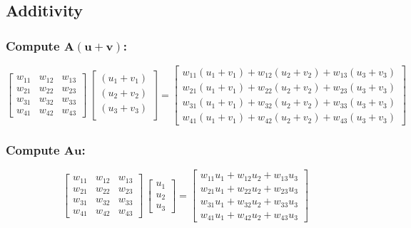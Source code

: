 \documentclass[12pt]{article}
\newcommand{\vsp}{\vspace*{1em}}
\begin{document}
\subsection{Additivity}

\subsubsection*{\noindent Compute $\mathbf{A} (\mathbf{u} + \mathbf{v})$:}

\[
    \begin{bmatrix}
        w_{11} & w_{12} & w_{13} \\
        w_{21} & w_{22} & w_{23} \\
        w_{31} & w_{32} & w_{33} \\
        w_{41} & w_{42} & w_{43}
    \end{bmatrix}
    \,
    \begin{bmatrix}
        (u_1 + v_1) \\
        (u_2 + v_2) \\
        (u_3 + v_3) \\
    \end{bmatrix}
    =
    \begin{bmatrix}
        w_{11} (u_1 + v_1)  + w_{12} (u_2 + v_2) + w_{13} (u_3 + v_3) \\
        w_{21} (u_1 + v_1)  + w_{22} (u_2 + v_2) + w_{23} (u_3 + v_3) \\
        w_{31} (u_1 + v_1)  + w_{32} (u_2 + v_2) + w_{33} (u_3 + v_3) \\
        w_{41} (u_1 + v_1)  + w_{42} (u_2 + v_2) + w_{43} (u_3 + v_3)
    \end{bmatrix}
\]

\vsp

\subsubsection*{Compute $\mathbf{A} \mathbf{u}$:}

\[
    \begin{bmatrix}
        w_{11} & w_{12} & w_{13} \\
        w_{21} & w_{22} & w_{23} \\
        w_{31} & w_{32} & w_{33} \\
        w_{41} & w_{42} & w_{43}
    \end{bmatrix}
    \,
    \begin{bmatrix}
        u_1 \\
        u_2 \\
        u_3
    \end{bmatrix}
    =
    \begin{bmatrix}
        w_{11} u_1  + w_{12} u_2 + w_{13} u_3 \\
        w_{21} u_1  + w_{22} u_2 + w_{23} u_3 \\
        w_{31} u_1  + w_{32} u_2 + w_{33} u_3 \\
        w_{41} u_1  + w_{42} u_2 + w_{43} u_3
    \end{bmatrix}
\]
\end{document}
